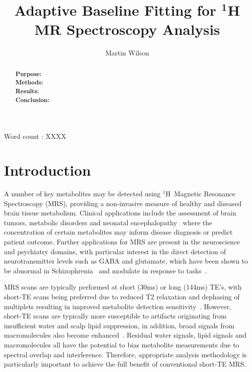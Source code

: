 \documentclass[num-refs]{wiley-article}
\title{Adaptive Baseline Fitting for $^{\textbf{1}}$H MR Spectroscopy Analysis}
\author[1]{Martin Wilson}
\affil[1]{Centre for Human Brain Health and School of Psychology, University of Birmingham, Birmingham, UK.}
\newcommand{\proton}{\ensuremath{^1\mathrm{H}}}
\begin{document}
\maketitle

\begin{abstract}
\textbf{Purpose:} \\
\textbf{Methods:} \\
\textbf{Results:} \\
\textbf{Conclusion:} 
\end{abstract}

Word count : XXXX


\section{Introduction}
A number of key metabolites may be detected using \proton\ Magnetic Resonance Spectroscopy (MRS), providing a non-invasive measure of healthy and diseased brain tissue metabolism. Clinical applications include the assessment of brain tumors, metabolic disorders and neonatal encephalopathy~\cite{Oz2014,Lally2019} where the concentration of certain metabolites may inform disease diagnosis or predict patient outcome. Further applications for MRS are present in the neuroscience and psychiatry domains, with particular interest in the direct detection of neurotransmitter levels such as GABA and glutamate, which have been shown to be abnormal in Schizophrenia~\cite{Merritt2016} and modulate in response to tasks~\cite{Jelen2018,Chen2017}.

MRS scans are typically performed at short (30ms) or long (144ms) TE's, with short-TE scans being preferred due to reduced T2 relaxation and dephasing of multiplets resulting in improved metabolite detection sensitivity~\cite{Wilson2019}. However, short-TE scans are typically more susceptible to artifacts originating from insufficient water and scalp lipid suppression, in addition, broad signals from macromolecules also become enhanced~\cite{Cudalbu2012}. Residual water signals, lipid signals and macromolecules all have the potential to bias metabolite measurements due to spectral overlap and interference. Therefore, appropriate analysis methodology is particularly important to achieve the full benefit of conventional short-TE MRS.
\end{document}
